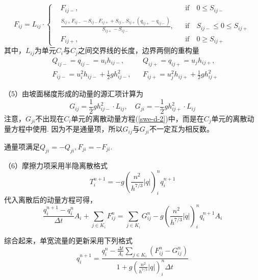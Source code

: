 \begin{equation}
F_{ij} = L_{ij} \cdot \left\{
\begin{aligned}
	& F_{ij-}, && \mbox{if} \quad 0\leq S_{ij-} \\
	& \frac{S_{ij+} F_{ij-} - S_{ij-} F_{ij+} + S_{ij-} S_{ij+} \left(q_{ij+} - q_{ij-}\right)}{S_{ij+}-S_{ij-}} , && \mbox{if} \quad S_{ij-} \leq 0\leq S_{ij+}\\
	& F_{ij+}, && \mbox{if} \quad 0\geq S_{ij+}
\end{aligned}\right.
\end{equation}
其中，$L_{ij}$为单元$C_i$与$C_j$之间交界线的长度，边界两侧的重构量
\begin{align*}
&Q_{ij-} = q_{ij-} = u_i h_{ij-},  && Q_{ij+} = q_{ij+} = u_j h_{ij+}, \\
&F_{ij-} = u_i^2h_{ij-}+\frac{1}{2}gh_{ij-}^2, && F_{ij+} = u_j^2h_{ij+}+\frac{1}{2}gh_{ij+}^2
\end{align*}

（5）由坡面梯度形成的动量的源汇项计算为
\begin{equation}
G_{ij} = \frac{1}{2}gh_{ij-}^2 \cdot L_{ij}, \quad
G_{ji}=-\frac{1}{2}g h_{ij+}^2 \cdot L_{ij}
\end{equation}
注意，$G_{ji}$不出现在$C_i$单元的离散动量方程(\ref{swe-d-2})中，而是在$C_j$单元的离散动量方程中使用. 因为不是通量项，所以$G_{ij}$与$G_{ji}$不一定互为相反数。

通量项满足$Q_{ji} = -Q_{ji},F_{ji}=-F_{ji}$.

（6）摩擦力项采用半隐离散格式
\begin{equation}
T^{n+1}_i = -g \left(\frac{n^2}{h^{7/3}} \left|q\right|\right)^n_i q^{n+1}_i
\end{equation}
代入离散后的动量方程可得，
 \begin{equation}
 \frac{ q^{n+1}_i - q^n_i}{\Delta t} A_i + \sum_{j\in K_i} F^n_{ij} = \sum_{j\in K_i} G^n_{ij}  -g \left(\frac{n^2}{h^{7/3}} \left|q\right|\right)^n_i q^{n+1}_i  A_i 
  \end{equation}

综合起来，单宽流量的更新采用下列格式
\begin{equation}
q^{n+1}_i = \frac{q^n_i - \frac{\Delta t}{A_i}\sum_{j\in K_i} \left(F^n_{ij} - G^n_{ij}\right)}{1 + g \left(\frac{n^2}{h^{7/3}} \left|q\right|\right)^n_i \Delta t}
\end{equation}

